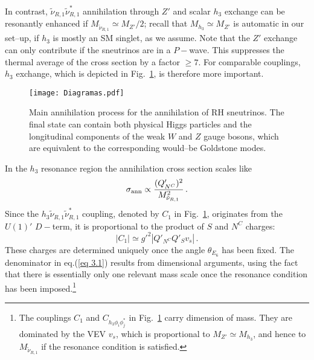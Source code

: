 \documentclass[a4paper,11pt]{article}
\begin{document}
In contrast, $\tilde \nu_{R,1} \tilde \nu_{R,1}^*$ annihilation
through $Z'$ and scalar $h_3$ exchange can be resonantly enhanced if
$M_{\tilde \nu_{R,1}} \simeq M_{Z'}/2$; recall that
$M_{h_3} \simeq M_{Z'}$ is automatic in our set--up, if $h_3$ is
mostly an SM singlet, as we assume. Note that the $Z'$ exchange can
only contribute if the sneutrinos are in a $P-$wave. This suppresses
the thermal average of the cross section by a factor $\geq 7$. For
comparable couplings, $h_3$ exchange, which is depicted in
Fig.~\ref{Fig2}, is therefore more important.

\begin{figure}[h!]
\centering
\texttt{[image: Diagramas.pdf]}
\caption{Main annihilation process for the annihilation of RH
  sneutrinos. The final state can contain both physical Higgs
  particles and the longitudinal components of the weak $W$ and $Z$
  gauge bosons, which are equivalent to the corresponding would--be
  Goldstone modes.} \label{Fig2}
\end{figure}

In the $h_3$ resonance region the annihilation cross section scales like
%
\begin{equation} \label{eq 3.1}
\sigma_{\rm ann} \propto \frac {(Q'_{N^C})^2} {M^2_{\tilde{\nu}_{R,1}}}\, .  
\end{equation}
%
Since the $h_3 \tilde \nu_{R,1} \tilde \nu_{R,1}^*$ coupling, denoted
by $C_1$ in Fig.~\ref{Fig2}, originates from the $U(1)'$ $D-$term, it
is proportional to the product of $S$ and $N^C$ charges:
%
\begin{equation}  \label{eq 3.3}
\left| C_1 \right| \simeq  g'^2 \left| Q'_{N^C} Q'_S v_s \right| \,.
\end{equation}
%
These charges are determined uniquely once the angle $\theta_{E_6}$
has been fixed. The denominator in eq.(\ref{eq 3.1}) results from
dimensional arguments, using the fact that there is essentially only
one relevant mass scale once the resonance condition has been
imposed.\footnote{The couplings $C_1$ and $C_{h_3 \phi_i \phi_j^*}$ in
  Fig.~\ref{Fig2} carry dimension of mass. They are dominated by the
  VEV $v_s$, which is proportional to $M_{Z'} \simeq M_{h_3}$, and
  hence to $M_{\tilde \nu_{R,1}}$ if the resonance condition is
  satisfied.}
\end{document}
